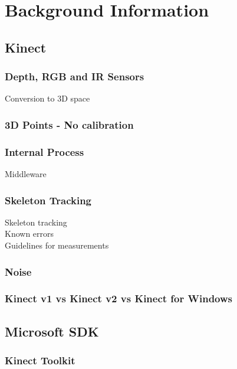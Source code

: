 \section{Background Information}


\subsection{Kinect}

\subsubsection{Depth, RGB and IR Sensors}
Conversion to 3D space \cite{nonContact2017}\\

\subsubsection{3D Points - No calibration}

\subsubsection{Internal Process}
Middleware \cite{nonContact2017}\\

\subsubsection{Skeleton Tracking}
Skeleton tracking\\
Known errors\\
Guidelines for measurements\\

\subsubsection{Noise}

\subsubsection{Kinect v1 vs Kinect v2 vs Kinect for Windows}


\subsection{Microsoft SDK}

\subsubsection{Kinect Toolkit}

